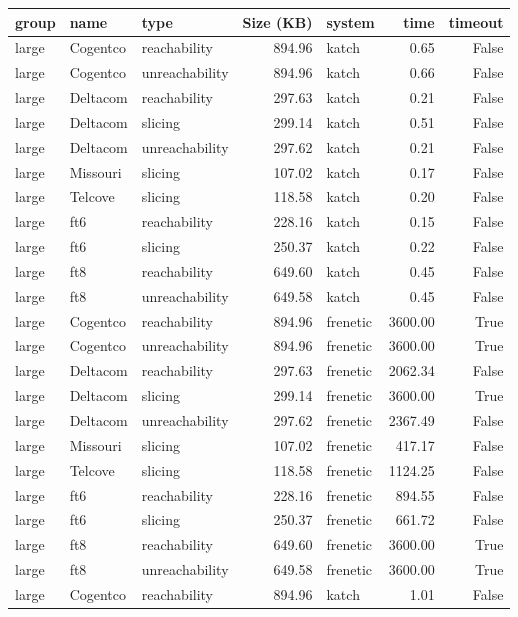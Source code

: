 \begin{tabular}{lllrlrr}
\toprule
group & name & type & Size (KB) & system & time & timeout \\
\midrule
large & Cogentco & reachability & 894.96 & katch & 0.65 & False \\
large & Cogentco & unreachability & 894.96 & katch & 0.66 & False \\
large & Deltacom & reachability & 297.63 & katch & 0.21 & False \\
large & Deltacom & slicing & 299.14 & katch & 0.51 & False \\
large & Deltacom & unreachability & 297.62 & katch & 0.21 & False \\
large & Missouri & slicing & 107.02 & katch & 0.17 & False \\
large & Telcove & slicing & 118.58 & katch & 0.20 & False \\
large & ft6 & reachability & 228.16 & katch & 0.15 & False \\
large & ft6 & slicing & 250.37 & katch & 0.22 & False \\
large & ft8 & reachability & 649.60 & katch & 0.45 & False \\
large & ft8 & unreachability & 649.58 & katch & 0.45 & False \\
large & Cogentco & reachability & 894.96 & frenetic & 3600.00 & True \\
large & Cogentco & unreachability & 894.96 & frenetic & 3600.00 & True \\
large & Deltacom & reachability & 297.63 & frenetic & 2062.34 & False \\
large & Deltacom & slicing & 299.14 & frenetic & 3600.00 & True \\
large & Deltacom & unreachability & 297.62 & frenetic & 2367.49 & False \\
large & Missouri & slicing & 107.02 & frenetic & 417.17 & False \\
large & Telcove & slicing & 118.58 & frenetic & 1124.25 & False \\
large & ft6 & reachability & 228.16 & frenetic & 894.55 & False \\
large & ft6 & slicing & 250.37 & frenetic & 661.72 & False \\
large & ft8 & reachability & 649.60 & frenetic & 3600.00 & True \\
large & ft8 & unreachability & 649.58 & frenetic & 3600.00 & True \\
large & Cogentco & reachability & 894.96 & katch & 1.01 & False \\

\end{tabular}
